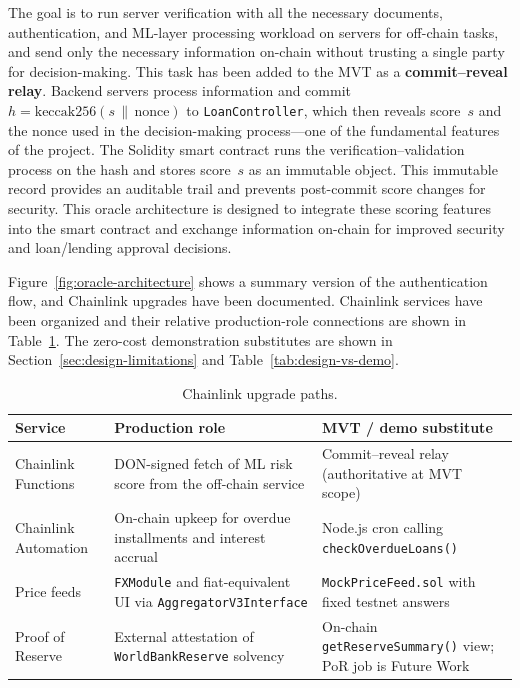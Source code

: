 \documentclass[12pt,a4paper]{report}
\newcommand{\tableheadcolor}{\rowcolor{TableHeadBg}}
\begin{document}
The goal is to run server verification with all the necessary documents, authentication, and ML-layer processing workload on servers for off-chain tasks, and send only the necessary information on-chain without trusting a single party for decision-making. This task has been added to the MVT as a \textbf{commit--reveal relay}. Backend servers process information and commit $h = \text{keccak256}(s \,\|\, \text{nonce})$ to \texttt{LoanController}, which then reveals score~$s$ and the nonce used in the decision-making process---one of the fundamental features of the project. The Solidity smart contract runs the verification--validation process on the hash and stores score~$s$ as an immutable object. This immutable record provides an auditable trail and prevents post-commit score changes for security. This oracle architecture is designed to integrate these scoring features into the smart contract and exchange information on-chain for improved security and loan/lending approval decisions.

Figure~\ref{fig:oracle-architecture} shows a summary version of the authentication flow, and Chainlink upgrades have been documented. Chainlink services have been organized and their relative production-role connections are shown in Table~\ref{tab:chainlink-upgrade-paths}. The zero-cost demonstration substitutes are shown in Section~\ref{sec:design-limitations} and Table~\ref{tab:design-vs-demo}.

\begin{table}[H]
\centering
\caption[Chainlink upgrade paths]{Chainlink upgrade paths.}
\label{tab:chainlink-upgrade-paths}
\small
\begin{tabular}{@{}p{2.6cm}p{4.8cm}p{5.8cm}@{}}
\toprule
\tableheadcolor
\textbf{Service} & \textbf{Production role} & \textbf{MVT / demo substitute} \\
\midrule
Chainlink Functions &
  DON-signed fetch of ML risk score from the off-chain service &
  Commit--reveal relay (authoritative at MVT scope) \\
\rowcolor{RowShade}
Chainlink Automation &
  On-chain upkeep for overdue installments and interest accrual &
  Node.js cron calling \texttt{checkOverdueLoans()} \\
Price feeds &
  \texttt{FXModule} and fiat-equivalent UI via \texttt{AggregatorV3Interface} &
  \texttt{MockPriceFeed.sol} with fixed testnet answers \\
\rowcolor{RowShade}
Proof of Reserve &
  External attestation of \texttt{WorldBankReserve} solvency &
  On-chain \texttt{getReserveSummary()} view; PoR job is Future Work \\
\bottomrule
\end{tabular}
\end{table}
\end{document}
